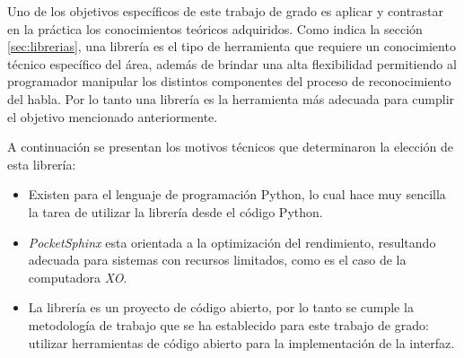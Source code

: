 Uno de los objetivos espec\'ificos de este trabajo de grado es aplicar y contrastar en la pr\'actica
los conocimientos te\'oricos adquiridos. Como indica la secci\'on \ref{sec:librerias}, una librer\'ia es
el tipo de herramienta que requiere un conocimiento t\'ecnico espec\'ifico del \'area, adem\'as de
brindar una alta flexibilidad permitiendo al programador manipular los distintos componentes del
proceso de reconocimiento del habla. Por lo tanto una librer\'ia es la herramienta m\'as adecuada
para cumplir el objetivo mencionado anteriormente.

A continuaci\'on se presentan los motivos t\'ecnicos que determinaron la elecci\'on de esta librer\'ia:

\begin{itemize}
    \item Existen  para el lenguaje de programaci\'on Python, lo cual hace muy sencilla la tarea de utilizar
	la librer\'ia desde el c\'odigo Python.
    \item \emph{PocketSphinx} esta orientada a la optimizaci\'on del rendimiento, resultando adecuada para sistemas con
	recursos limitados, como es el caso de la computadora \emph{XO}.
    \item La librer\'ia es un proyecto de c\'odigo abierto, por lo tanto se cumple la metodolog\'ia de trabajo que se ha
	establecido para este trabajo de grado: utilizar herramientas de c\'odigo abierto para la implementaci\'on de la
	interfaz.
\end{itemize}
